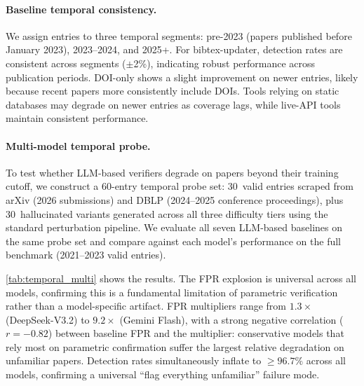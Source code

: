 \paragraph{Baseline temporal consistency.}
We assign entries to three temporal segments: pre-2023 (papers published before January 2023), 2023--2024, and 2025+.
For bibtex-updater, detection rates are consistent across segments ($\pm$2\%), indicating robust performance across publication periods.
DOI-only shows a slight improvement on newer entries, likely because recent papers more consistently include DOIs.
Tools relying on static databases may degrade on newer entries as coverage lags, while live-API tools maintain consistent performance.

\paragraph{Multi-model temporal probe.}
To test whether LLM-based verifiers degrade on papers beyond their training cutoff, we construct a 60-entry temporal probe set: 30~valid entries scraped from arXiv (2026 submissions) and DBLP (2024--2025 conference proceedings), plus 30~hallucinated variants generated across all three difficulty tiers using the standard perturbation pipeline.
We evaluate all seven LLM-based baselines on the same probe set and compare against each model's performance on the full benchmark (2021--2023 valid entries).

\cref{tab:temporal_multi} shows the results.
The FPR explosion is universal across all models, confirming this is a fundamental limitation of parametric verification rather than a model-specific artifact.
FPR multipliers range from $1.3{\times}$ (DeepSeek-V3.2) to $9.2{\times}$ (Gemini Flash), with a strong negative correlation ($r = -0.82$) between baseline FPR and the multiplier: conservative models that rely most on parametric confirmation suffer the largest relative degradation on unfamiliar papers.
Detection rates simultaneously inflate to ${\geq}96.7\%$ across all models, confirming a universal ``flag everything unfamiliar'' failure mode.

